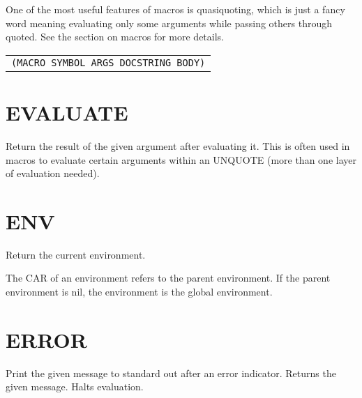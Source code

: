\documentclass[
letterpaper,
oneside,
]{memoir}
\begin{document}
\noindent
One of the most useful features of macros is quasiquoting, which is just a fancy word meaning evaluating only some arguments while passing others through quoted. See the section on macros for more details.

\begin{center}
  \begin{tabular}{c}
    \texttt{(MACRO SYMBOL ARGS DOCSTRING BODY)}
  \end{tabular}
\end{center}

\vspace{1em}

\section{EVALUATE}

\noindent
Return the result of the given argument after evaluating it. This is often used in macros to evaluate certain arguments within an UNQUOTE (more than one layer of evaluation needed).

\vspace{1em}

\section{ENV}

\noindent
Return the current environment.

\noindent
The CAR of an environment refers to the parent environment. If the parent environment is nil, the environment is the global environment.

\vspace{1em}

\section{ERROR}

\noindent
Print the given message to standard out after an error indicator. Returns the given message. Halts evaluation.
\end{document}
